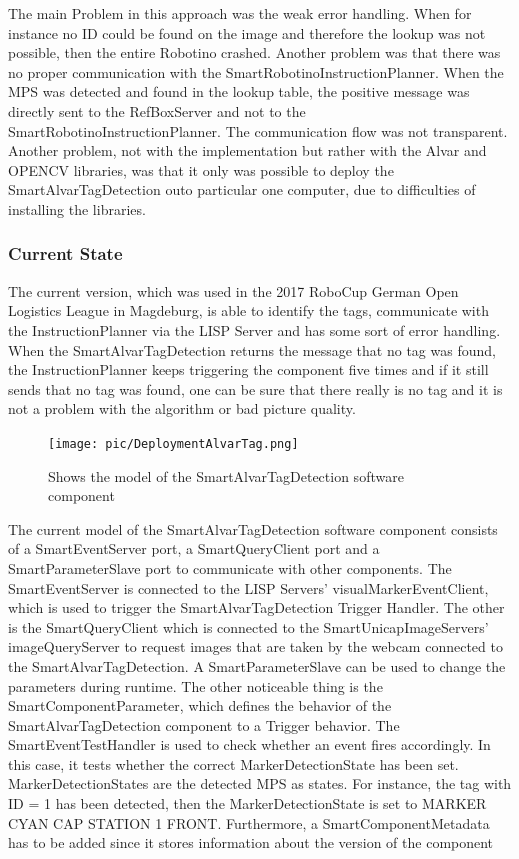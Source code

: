 The main Problem in this approach was the weak error handling. When for instance no ID could be found on the image and therefore the lookup was not possible, then the entire Robotino crashed. Another problem was that there was no proper communication with the SmartRobotinoInstructionPlanner. When the MPS was detected and found in the lookup table, the positive message was directly sent to the RefBoxServer and not to the SmartRobotinoInstructionPlanner. The communication flow was not transparent. Another problem, not with the implementation but rather with the Alvar and OPENCV libraries, was that it only was possible to deploy the SmartAlvarTagDetection outo particular one computer, due to difficulties of installing the libraries.



\subsubsection{Current State}

The current version, which was used in the 2017 RoboCup German Open Logistics League in Magdeburg, is able to identify the tags, communicate with the InstructionPlanner via the LISP Server and has some sort of error handling. When the SmartAlvarTagDetection returns the message that no tag was found, the InstructionPlanner keeps triggering the component five times and if it still sends that no tag was found, one can be sure that there really is no tag and it is not a problem with the algorithm or bad picture quality. \\

\begin{figure}[h]
\centering
\texttt{[image: pic/DeploymentAlvarTag.png]}
\caption{Shows the model of the SmartAlvarTagDetection software component}
\label{fig:smartAlvarFlow}
\end{figure}



The current model of the SmartAlvarTagDetection software component consists of a SmartEventServer port, a SmartQueryClient port and a SmartParameterSlave port to communicate with other components. The SmartEventServer is connected to the LISP Servers' visualMarkerEventClient, which is used to trigger the SmartAlvarTagDetection Trigger Handler. The other is the SmartQueryClient which is connected to the SmartUnicapImageServers' imageQueryServer to request images that are taken by the webcam connected to the SmartAlvarTagDetection. A SmartParameterSlave can be used to change the parameters during runtime. The other noticeable thing is the SmartComponentParameter, which defines the behavior of the SmartAlvarTagDetection component to a Trigger behavior. The SmartEventTestHandler is used to check whether an event fires accordingly. In this case, it tests whether the correct MarkerDetectionState has been set. MarkerDetectionStates are the detected MPS as states. For instance, the tag with ID = 1 has been detected, then the MarkerDetectionState is set to MARKER CYAN CAP STATION 1 FRONT. Furthermore, a SmartComponentMetadata has to be added since it stores information about the version of the component\\

